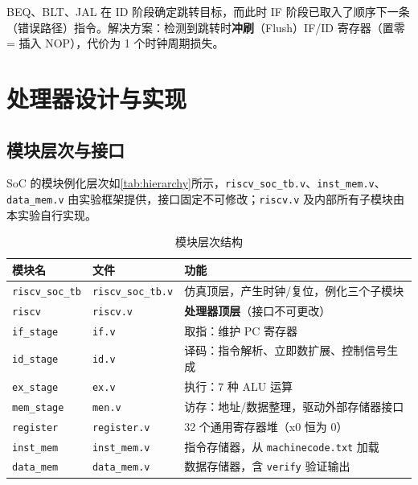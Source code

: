 \documentclass[12pt,hyperref,a4paper,UTF8]{ctexart}
\begin{document}
BEQ、BLT、JAL 在 ID 阶段确定跳转目标，而此时 IF 阶段已取入了顺序下一条（错误路径）指令。解决方案：检测到跳转时\textbf{冲刷}（Flush）IF/ID 寄存器（置零 = 插入 NOP），代价为 1 个时钟周期损失。

\section{处理器设计与实现}

\subsection{模块层次与接口}

SoC 的模块例化层次如\autoref{tab:hierarchy}所示，\texttt{riscv\_soc\_tb.v}、\texttt{inst\_mem.v}、\texttt{data\_mem.v} 由实验框架提供，接口固定不可修改；\texttt{riscv.v} 及内部所有子模块由本实验自行实现。

\begin{table}[H]
    \centering
    \caption{模块层次结构}
    \label{tab:hierarchy}
    \begin{tabular}{lll}
        \toprule
        模块名 & 文件 & 功能 \\
        \midrule
        \texttt{riscv\_soc\_tb} & \texttt{riscv\_soc\_tb.v} & 仿真顶层，产生时钟/复位，例化三个子模块 \\
        \quad\texttt{riscv} & \texttt{riscv.v} & \textbf{处理器顶层}（接口不可更改） \\
        \quad\quad\texttt{if\_stage} & \texttt{if.v} & 取指：维护 PC 寄存器 \\
        \quad\quad\texttt{id\_stage} & \texttt{id.v} & 译码：指令解析、立即数扩展、控制信号生成 \\
        \quad\quad\texttt{ex\_stage} & \texttt{ex.v} & 执行：7 种 ALU 运算 \\
        \quad\quad\texttt{mem\_stage} & \texttt{men.v} & 访存：地址/数据整理，驱动外部存储器接口 \\
        \quad\quad\texttt{register} & \texttt{register.v} & 32 个通用寄存器堆（x0 恒为 0） \\
        \quad\texttt{inst\_mem} & \texttt{inst\_mem.v} & 指令存储器，从 \texttt{machinecode.txt} 加载 \\
        \quad\texttt{data\_mem} & \texttt{data\_mem.v} & 数据存储器，含 \texttt{verify} 验证输出 \\
        \bottomrule
    \end{tabular}
\end{table}
\end{document}
